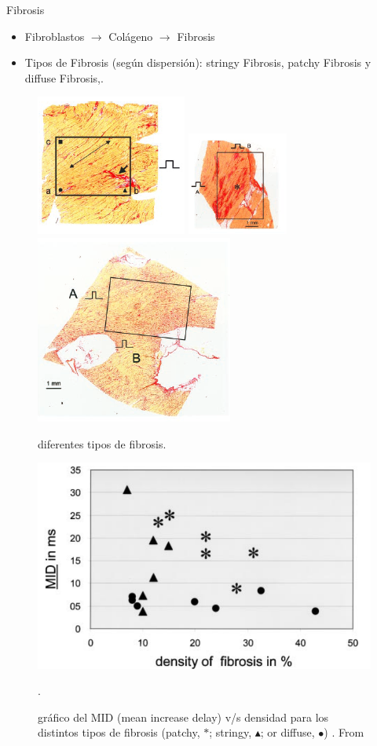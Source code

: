 \documentclass[11pt,spanish]{beamer}
\begin{document}
\begin{frame}{Fibrosis}

\begin{itemize}
\item Fibroblastos \pause $\rightarrow$ Colágeno \pause $\rightarrow$ Fibrosis \pause
\item Tipos de Fibrosis (según dispersión): stringy Fibrosis, \pause patchy Fibrosis \pause y diffuse Fibrosis,.
\end{itemize}

\begin{figure}[H]
\centering
\includegraphics[width = 3 cm]{fig/fundamentals-fib-stringy}
\includegraphics[width = 3 cm]{fig/fundamentals-fib-patchy} 
\includegraphics[width = 3 cm]{fig/fundamentals-fib-diffuse} 
\caption{diferentes tipos de fibrosis.}
\end{figure}

\end{frame}

\begin{frame}
\begin{figure}[H]
\includegraphics[width= 8 cm]{fig/fundamentals-fib-midvsdensity}
\caption{gráfico del MID (mean increase delay) v/s densidad para los distintos tipos de fibrosis (patchy, $*$; stringy, $\blacktriangle$; or diffuse, $\bullet$) . From \cite{Kawara2001Circ}}. \label{fig:midvsdensity}
\end{figure}
\end{frame}
\end{document}
